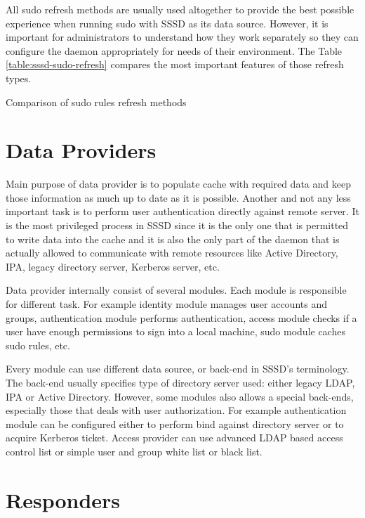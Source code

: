 All sudo refresh methods are usually used altogether to provide the best
possible experience when running sudo with SSSD as its data source. However, it
is important for administrators to understand how they work separately so they
can configure the daemon appropriately for needs of their environment. The Table
\ref{table:sssd-sudo-refresh} compares the most important features of those
refresh types.

\begin{table}[H]
  \centering
  
  \caption{Comparison of sudo rules refresh methods}
  \label{table:sssd-sudo-refresh}
\end{table}

\section{Data Providers}
\label{sssd:providers}

Main purpose of data provider is to populate cache with required data and keep
those information as much up to date as it is possible. Another and not any less
important task is to perform user authentication directly against remote server.
It is the most privileged process in SSSD since it is the only one that is
permitted to write data into the cache and it is also the only part of the
daemon that is actually allowed to communicate with remote resources like Active
Directory, IPA, legacy directory server, Kerberos server, etc.

Data provider internally consist of several modules. Each module is responsible
for different task. For example identity module manages user accounts and
groups, authentication module performs authentication, access module checks if a
user have enough permissions to sign into a local machine, sudo module caches
sudo rules, etc.

Every module can use different data source, or back-end in SSSD's terminology.
The back-end usually specifies type of directory server used: either legacy
LDAP, IPA or Active Directory. However, some modules also allows a special
back-ends, especially those that deals with user authorization. For example
authentication module can be configured either to perform bind against directory
server or to acquire Kerberos ticket. Access provider can use advanced LDAP
based access control list or simple user and group white list or black list.

\section{Responders}
\label{sssd:responders}

